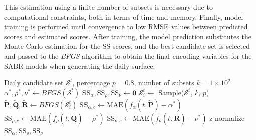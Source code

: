 This estimation using a finite number of subsets is necessary due to computational constraints, both in terms of time and memory.
Finally, model training is performed until convergence to low RMSE values between predicted scores and estimated scores.
After training, the model prediction substitutes the Monte Carlo estimation for the SS scores,
and the best candidate set is selected and passed to the \textit{BFGS} algorithm to obtain the final encoding variables for the SABR models when generating the daily surface.

\begin{algorithm}
    \begin{algorithmic}[1]
        \Require Daily candidate set $\mathcal{S}^{t}$, percentage $p=0.8$, number of subsets $k=1 \times 10^2$
        \State $\alpha^{*}, \rho^{*}, \nu^{*} \gets \textit{BFGS} (\mathcal{S}^{t})$
        \State $\text{SS}_{\alpha}, \text{SS}_{\rho}, \text{SS}_{\nu} \gets \mathbf{0}$
            \State $\mathcal{S}_{i}^{t} \gets$ Sample($\mathcal{S}^{t}$, $k$, $p$)
            \State $\widetilde{\textbf{P}}, \widetilde{\textbf{Q}}, \widetilde{\textbf{R}} \gets \textit{BFGS}(\mathcal{S}_{i}^{t})$
            \State $\text{SS}_{\alpha, c} \gets \text{MAE}(f_{\alpha}(t, \widetilde{\textbf{P}}) - \alpha^{*})$
            \State $\text{SS}_{\rho, c} \gets \text{MAE}(f_{\rho}(t, \widetilde{\textbf{Q}}) - \rho^{*})$
            \State $\text{SS}_{\nu, c} \gets \text{MAE}(f_{\nu}(t, \widetilde{\textbf{R}}) - \nu^{*})$
        \EndFor
        \State z-normalize $\text{SS}_{\alpha}, \text{SS}_{\rho}, \text{SS}_{\nu}$
    \end{algorithmic}
    \caption{Monte Carlo Estimation of Target Z-Scores}
    \label{alg:mc}
\end{algorithm}

